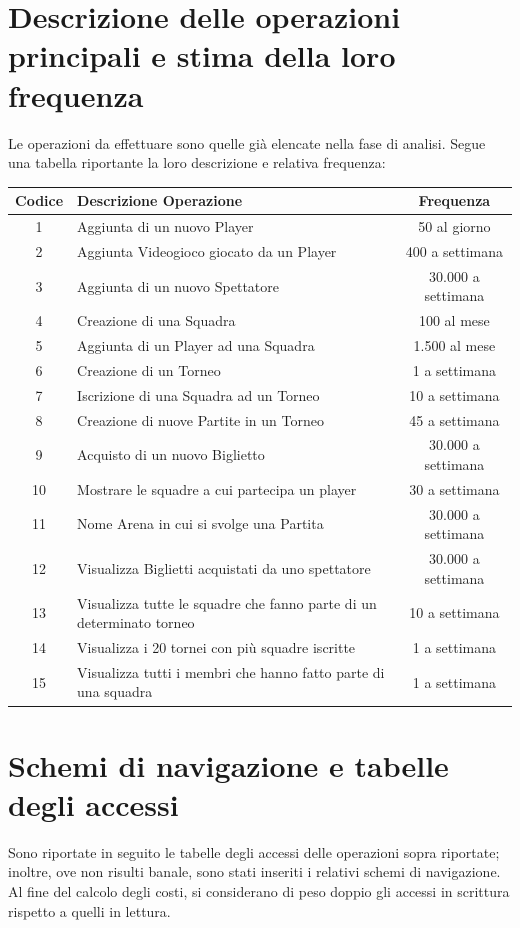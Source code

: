 \documentclass[a4paper,12pt]{report}
\begin{document}
\section{Descrizione delle operazioni principali e stima della loro frequenza}
Le operazioni da effettuare sono quelle già elencate nella fase di analisi. Segue una tabella
riportante la loro descrizione e relativa frequenza:
\begin{center}
	\begin{tabular}{|c|m{8cm}|c|}
		\hline\rowcolor{pink}
		Codice & Descrizione Operazione & Frequenza\\
		\hline\hline
		1 & Aggiunta di un nuovo Player & 50 al giorno\\ 
		\hline	
		2 & Aggiunta Videogioco giocato da un Player & 400 a settimana \\
		\hline
		3 & Aggiunta di un nuovo Spettatore & 30.000 a settimana \\
		\hline
		4 & Creazione di una Squadra & 100 al mese\\
		\hline 
		5 & Aggiunta di un Player ad una Squadra & 1.500 al mese\\ 
		\hline
		6 & Creazione di un Torneo & 1 a settimana\\ 
		\hline
		7 & Iscrizione di una Squadra ad un Torneo & 10 a settimana\\ 
		\hline
		8 & Creazione di nuove Partite in un Torneo & 45 a settimana\\ 
		\hline
		9 & Acquisto di un nuovo Biglietto & 30.000 a settimana\\ 
		\hline
		10 & Mostrare le squadre a cui partecipa un player & 30 a settimana\\
		\hline
		11 & Nome Arena in cui si svolge una Partita & 30.000 a settimana\\
		\hline
		12 & Visualizza Biglietti acquistati da uno spettatore & 30.000 a settimana\\
		\hline
		13 & Visualizza tutte le squadre che fanno parte di un determinato torneo & 10 a settimana\\
		\hline
		14 & Visualizza i 20 tornei con più squadre iscritte & 1 a settimana\\
		\hline
		15 & Visualizza tutti i membri che hanno fatto parte di una squadra & 1 a settimana\\
		\hline
	\end{tabular}
\end{center}
\section{Schemi di navigazione e tabelle degli accessi}
Sono riportate in seguito le tabelle degli accessi delle operazioni sopra riportate; inoltre, ove
non risulti banale, sono stati inseriti i relativi schemi di navigazione. Al fine del calcolo degli
costi, si considerano di peso doppio gli accessi in scrittura rispetto a quelli in lettura.
\renewcommand{\arraystretch}{1.15} %
\setlength{\arrayrulewidth}{0.5mm}%
\setlength{\tabcolsep}{10pt}%
\setlength\doublerulesep{0.1cm}%
\end{document}

